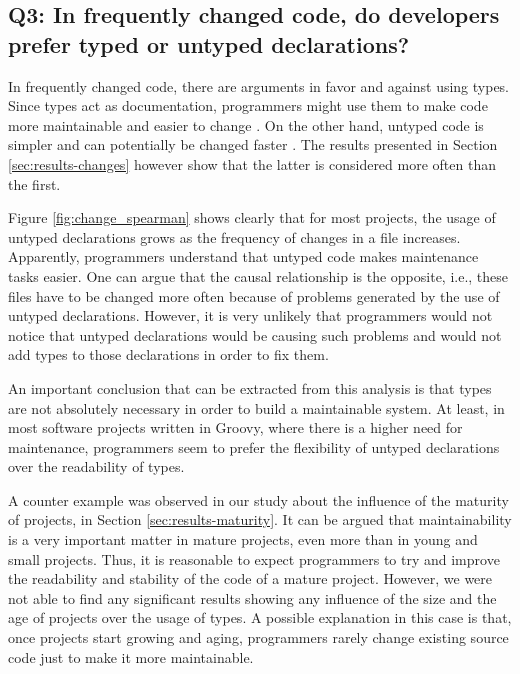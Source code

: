 \documentclass[preprint]{sigplanconf}
\begin{document}
\subsection*{Q3: In frequently changed code, do developers prefer typed or untyped declarations?\label{discussion-q3}}
In frequently changed code, there are arguments in favor and against using types.
Since types act as documentation, programmers might use them to make code more maintainable and easier to change  \cite{should_your_specification_language_be_typed}.
On the other hand, untyped code is simpler and can potentially be changed faster \cite{gradual_typing}.
The results presented in Section \ref{sec:results-changes} however show that the latter is considered more often than the first.

Figure \ref{fig:change_spearman} shows clearly that for most projects, the usage of untyped declarations grows as the frequency of changes in a file increases.
Apparently, programmers understand that untyped code makes maintenance tasks easier.
One can argue that the causal relationship is the opposite, i.e., these files have to be changed more often because of problems generated by the use of untyped declarations.
However, it is very unlikely that programmers would not notice that untyped declarations would be causing such problems and would not add types to those declarations in order to fix them.

An important conclusion that can be extracted from this analysis is that types are not absolutely necessary in order to build a maintainable system.
At least, in most software projects written in Groovy, where there is a higher need for maintenance, programmers seem to prefer the flexibility of untyped declarations over the readability of types.


A counter example was observed in our study about the influence of the maturity of projects, in Section \ref{sec:results-maturity}.
It can be argued that maintainability is a very important matter in mature projects, even more than in young and small projects.
Thus, it is reasonable to expect programmers to try and improve the readability and stability of the code of a mature project.
However, we were not able to find any significant results showing any influence of the size and the age of projects over the usage of types.
A possible explanation in this case is that, once projects start growing and aging, programmers rarely change existing source code just to make it more maintainable.

\end{document}
